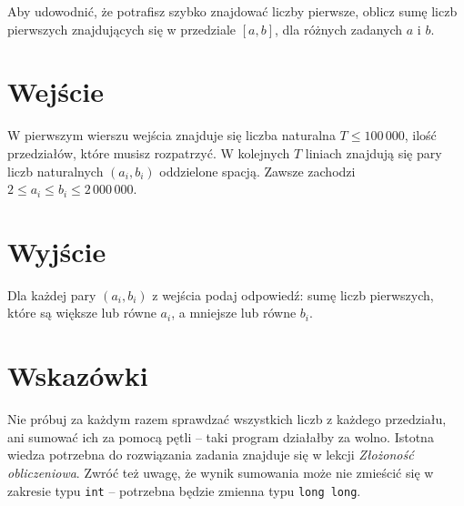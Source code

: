\documentclass{spiral-kurs}
\begin{document}
\makeheader
%

    Aby udowodnić, że potrafisz szybko znajdować liczby pierwsze, oblicz sumę liczb pierwszych znajdujących się w przedziale $[a, b]$, dla różnych zadanych $a$ i $b$.

    \section{Wejście}
    W pierwszym wierszu wejścia znajduje się liczba naturalna $T \leq 100\,000$, ilość przedziałów, które musisz rozpatrzyć. W kolejnych $T$ liniach znajdują się
    pary liczb naturalnych $(a_i, b_i)$ oddzielone spacją. Zawsze zachodzi $2 \leq a_i \leq b_i \leq 2\,000\,000$.

    \section{Wyjście}

    Dla każdej pary $(a_i, b_i)$ z wejścia podaj odpowiedź: sumę liczb pierwszych, które są większe lub równe $a_i$, a mniejsze lub równe $b_i$.


    \section{Wskazówki}
    Nie próbuj za każdym razem sprawdzać wszystkich liczb z każdego przedziału, ani sumować ich za pomocą pętli -- taki program działałby za wolno.
    Istotna wiedza potrzebna do rozwiązania zadania znajduje się w lekcji {\it Złożoność obliczeniowa}. Zwróć też uwagę, że wynik sumowania może nie zmieścić się
    w zakresie typu {\tt int} -- potrzebna będzie zmienna typu {\tt long long}.

  
\end{document}
